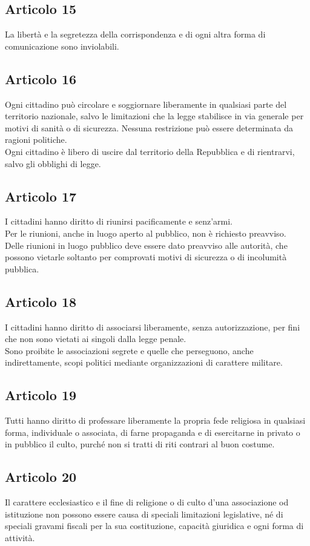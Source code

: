\documentclass{article}
\newcommand{\articolo}[1]{
	\subsection*{Articolo #1}
}
\begin{document}
\articolo{15}
La libertà e la segretezza della corrispondenza e di ogni altra forma di comunicazione sono inviolabili.\\

\articolo{16}
Ogni cittadino può circolare e soggiornare liberamente in qualsiasi parte del territorio nazionale, salvo le limitazioni che la legge stabilisce in via generale per motivi di sanità o di sicurezza. Nessuna restrizione può essere determinata da ragioni politiche.\\
Ogni cittadino è libero di uscire dal territorio della Repubblica e di rientrarvi, salvo gli obblighi di legge.

\articolo{17}
I cittadini hanno diritto di riunirsi pacificamente e senz’armi.\\
Per le riunioni, anche in luogo aperto al pubblico, non è richiesto preavviso.\\
Delle riunioni in luogo pubblico deve essere dato preavviso alle autorità, che possono vietarle soltanto per comprovati motivi di sicurezza o di incolumità pubblica.

\articolo{18}
I cittadini hanno diritto di associarsi liberamente, senza autorizzazione, per fini che non sono vietati ai singoli dalla legge penale.\\
Sono proibite le associazioni segrete e quelle che perseguono, anche indirettamente, scopi politici mediante organizzazioni di carattere militare.


\articolo{19}
Tutti hanno diritto di professare liberamente la propria fede religiosa in qualsiasi forma, individuale o associata, di farne propaganda e di esercitarne in privato o in pubblico il culto, purché non si tratti di riti contrari al buon costume.

\articolo{20}
Il carattere ecclesiastico e il fine di religione o di culto d’una associazione od istituzione non possono essere causa di speciali limitazioni legislative, né di speciali gravami fiscali per la sua costituzione, capacità giuridica e ogni forma di attività.
\end{document}
